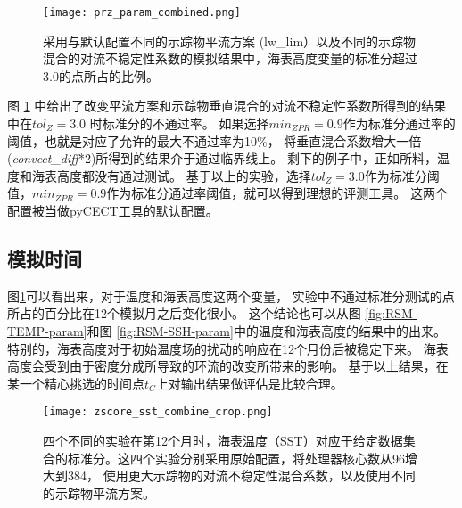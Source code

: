 \begin{figure} 
\centering
\texttt{[image: prz\_param\_combined.png]}
\caption{ 
  采用与默认配置不同的示踪物平流方案 (lw\_lim）以及不同的示踪物混合的对流不稳定性系数的模拟结果中，海表高度变量的标准分超过3.0的点所占的比例。}
\label {fig:PRZ-temp-param}
\end{figure}

   
图 \ref{fig:PRZ-temp-param} 中给出了改变平流方案和示踪物垂直混合的对流不稳定性系数所得到的结果中在$tol_{Z} = 3.0$ 时标准分的不通过率。
如果选择$min_{ZPR} = 0.9$作为标准分通过率的阈值，也就是对应了允许的最大不通过率为10\%， 将垂直混合系数增大一倍(\textit{convect\_diff}*2)所得到的结果介于通过临界线上。
剩下的例子中，正如所料，温度和海表高度都没有通过测试。 
基于以上的实验，选择$tol_{Z} = 3.0$作为标准分阈值，$min_{ZPR} = 0.9$作为标准分通过率阈值，就可以得到理想的评测工具。
这两个配置被当做pyCECT工具的默认配置。 


 \subsection{模拟时间}\label{verify:time}
 
图\ref{fig:PRZ-temp-param}可以看出来，对于温度和海表高度这两个变量， 实验中不通过标准分测试的点所占的百分比在12个模拟月之后变化很小。
这个结论也可以从图 \ref{fig:RSM-TEMP-param}和图 \ref{fig:RSM-SSH-param}中的温度和海表高度的结果中的出来。 
特别的，海表高度对于初始温度场的扰动的响应在12个月份后被稳定下来。 
海表高度会受到由于密度分成所导致的环流的改变所带来的影响。
基于以上结果，在某一个精心挑选的时间点$t_C$上对输出结果做评估是比较合理。 

  
\begin{figure}
\centering
\texttt{[image: zscore\_sst\_combine\_crop.png]}
\caption{四个不同的实验在第12个月时，海表温度（SST）对应于给定数据集合的标准分。这四个实验分别采用原始配置，将处理器核心数从96增大到384， 使用更大示踪物的对流不稳定性混合系数，以及使用不同的示踪物平流方案。}
\label {fig:zscore-combine}
\end{figure}

